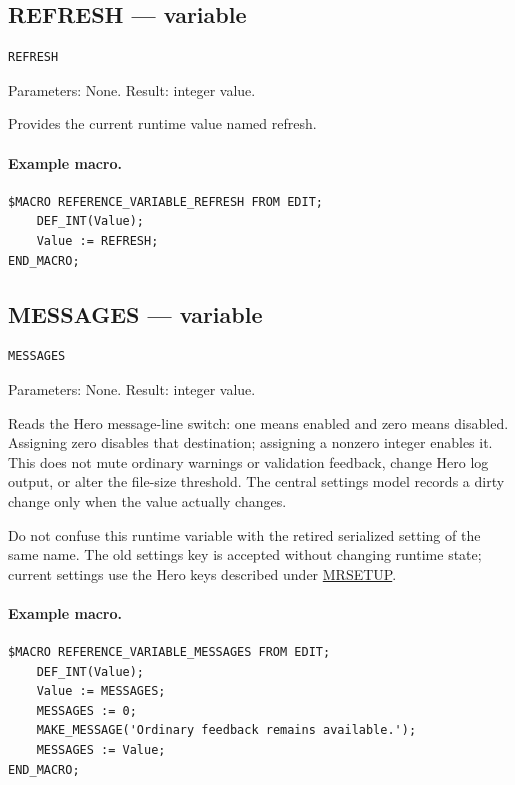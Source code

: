 \documentclass[a4paper,10pt,twoside,openany]{book}
\newenvironment{mrmacextension}{\begin{changebar}}{\end{changebar}}
\begin{document}
\label{prim:variable-refresh}
\subsection*{REFRESH --- variable}
\begin{verbatim}
REFRESH
\end{verbatim}
Parameters: None. Result: integer value.

Provides the current runtime value named refresh.

\paragraph{Example macro.}
\begin{verbatim}
$MACRO REFERENCE_VARIABLE_REFRESH FROM EDIT;
    DEF_INT(Value);
    Value := REFRESH;
END_MACRO;
\end{verbatim}

\begin{mrmacextension}
\label{prim:variable-messages}
\subsection*{MESSAGES --- variable}
\begin{verbatim}
MESSAGES
\end{verbatim}
Parameters: None. Result: integer value.

Reads the Hero message-line switch: one means enabled and zero means disabled.
Assigning zero disables that destination; assigning a nonzero integer enables
it. This does not mute ordinary warnings or validation feedback, change Hero
log output, or alter the file-size threshold. The central settings model
records a dirty change only when the value actually changes.

Do not confuse this runtime variable with the retired serialized setting of
the same name. The old settings key is accepted without changing runtime
state; current settings use the Hero keys described under
\hyperref[prim:procedure-mrsetup]{MRSETUP}.

\paragraph{Example macro.}
\begin{verbatim}
$MACRO REFERENCE_VARIABLE_MESSAGES FROM EDIT;
    DEF_INT(Value);
    Value := MESSAGES;
    MESSAGES := 0;
    MAKE_MESSAGE('Ordinary feedback remains available.');
    MESSAGES := Value;
END_MACRO;
\end{verbatim}
\end{mrmacextension}
\end{document}
